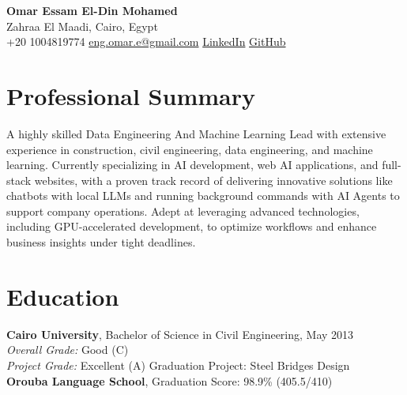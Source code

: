 \documentclass[10pt, letterpaper]{article}
\begin{document}
\begin{center}
    {\LARGE \textbf{Omar Essam El-Din Mohamed}} \\
    {Zahraa El Maadi, Cairo, Egypt} \\
    {\faPhone* \hspace{0.2cm} +20 1004819774} \hspace{1cm}
    {\href{mailto:eng.omar.e@gmail.com}{\faEnvelope[regular] \hspace{0.2cm} eng.omar.e@gmail.com}} \hspace{1cm}
            {\href{https://www.linkedin.com/in/omar-essam-b602279b}{\faLinkedin \hspace{0.2cm} LinkedIn}} \hspace{1cm}
    {\href{https://github.com/engomaressam}{\faGithub \hspace{0.2cm} GitHub}}
\end{center}

\section{Professional Summary}
A highly skilled Data Engineering And Machine Learning Lead with extensive experience in construction, civil engineering, data engineering, and machine learning. Currently specializing in AI development, web AI applications, and full-stack websites, with a proven track record of delivering innovative solutions like chatbots with local LLMs and running background commands with AI Agents to support company operations. Adept at leveraging advanced technologies, including GPU-accelerated development, to optimize workflows and enhance business insights under tight deadlines.

\section{Education}
\textbf{Cairo University}, Bachelor of Science in Civil Engineering, May 2013 \\
\textit{Overall Grade:} Good (C) \\
\textit{Project Grade:} Excellent (A) {Graduation Project:} Steel Bridges Design \\

\textbf{Orouba Language School}, Graduation Score: 98.9\% (405.5/410)
\end{document}
